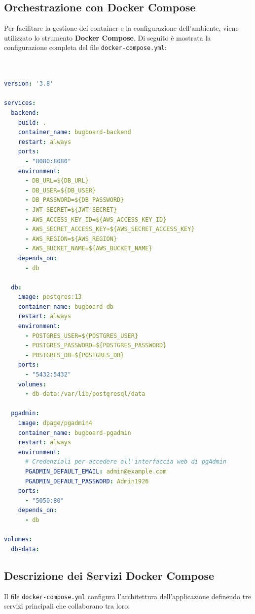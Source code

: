 \subsection{Orchestrazione con Docker Compose}
Per facilitare la gestione dei container e la configurazione dell'ambiente, viene utilizzato lo strumento \textbf{Docker Compose}. 
Di seguito è mostrata la configurazione completa del file \texttt{docker-compose.yml}:
\\\\\\
\begin{lstlisting}[language=yaml, caption={Configurazione docker-compose.yml}]
version: '3.8'

services:
  backend:
    build: .
    container_name: bugboard-backend
    restart: always
    ports:
      - "8080:8080"
    environment:
      - DB_URL=${DB_URL}
      - DB_USER=${DB_USER}
      - DB_PASSWORD=${DB_PASSWORD}
      - JWT_SECRET=${JWT_SECRET}
      - AWS_ACCESS_KEY_ID=${AWS_ACCESS_KEY_ID}
      - AWS_SECRET_ACCESS_KEY=${AWS_SECRET_ACCESS_KEY}
      - AWS_REGION=${AWS_REGION}
      - AWS_BUCKET_NAME=${AWS_BUCKET_NAME}
    depends_on:
      - db

  db:
    image: postgres:13
    container_name: bugboard-db
    restart: always
    environment:
      - POSTGRES_USER=${POSTGRES_USER}
      - POSTGRES_PASSWORD=${POSTGRES_PASSWORD}
      - POSTGRES_DB=${POSTGRES_DB}
    ports:
      - "5432:5432"
    volumes:
      - db-data:/var/lib/postgresql/data

  pgadmin:
    image: dpage/pgadmin4
    container_name: bugboard-pgadmin
    restart: always
    environment:
      # Credenziali per accedere all'interfaccia web di pgAdmin
      PGADMIN_DEFAULT_EMAIL: admin@example.com
      PGADMIN_DEFAULT_PASSWORD: Admin1926
    ports:
      - "5050:80"
    depends_on:
      - db

volumes:
  db-data:
\end{lstlisting}


\subsection{Descrizione dei Servizi Docker Compose}
Il file \texttt{docker-compose.yml} configura l'architettura dell'applicazione definendo tre servizi principali che collaborano tra loro:

